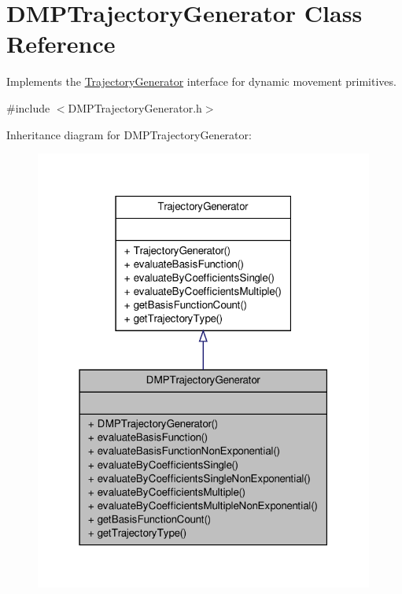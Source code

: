 \hypertarget{classDMPTrajectoryGenerator}{\section{\-D\-M\-P\-Trajectory\-Generator \-Class \-Reference}
\label{classDMPTrajectoryGenerator}
}


\-Implements the \hyperlink{classTrajectoryGenerator}{\-Trajectory\-Generator} interface for dynamic movement primitives.  




{\ttfamily \#include $<$\-D\-M\-P\-Trajectory\-Generator.\-h$>$}



\-Inheritance diagram for \-D\-M\-P\-Trajectory\-Generator\-:\nopagebreak
\begin{figure}[H]
\begin{center}
\leavevmode
\includegraphics[width=316pt]{classDMPTrajectoryGenerator__inherit__graph}
\end{center}
\end{figure}


